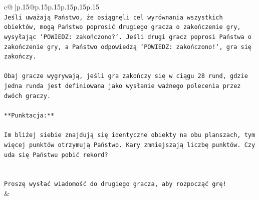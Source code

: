 \documentclass{article}
\begin{document}
{\begin{supertabular}{c@{$\;$}|p{.15\linewidth}@{}p{.15\linewidth}p{.15\linewidth}p{.15\linewidth}p{.15\linewidth}p{.15\linewidth}}
{{{\\ 
\texttt{Jeśli uważają Państwo, że osiągnęli cel wyrównania wszystkich obiektów, mogą Państwo poprosić drugiego gracza o zakończenie gry, wysyłając `POWIEDZ: zakończono?`. Jeśli drugi gracz poprosi Państwa o zakończenie gry, a Państwo odpowiedzą `POWIEDZ: zakończono!`, gra się zakończy.} \\
\\ 
\texttt{Obaj gracze wygrywają, jeśli gra zakończy się w ciągu 28 rund, gdzie jedna runda jest definiowana jako wysłanie ważnego polecenia przez dwóch graczy.} \\
\\ 
\texttt{**Punktacja:**} \\
\\ 
\texttt{Im bliżej siebie znajdują się identyczne obiekty na obu planszach, tym więcej punktów otrzymują Państwo. Kary zmniejszają liczbę punktów. Czy uda się Państwu pobić rekord?} \\
\\ 
\\ 
\texttt{Proszę wysłać wiadomość do drugiego gracza, aby rozpocząć grę!} \\
            }
        }
    }
    & \\ \\


\end{supertabular}}
\end{document}

